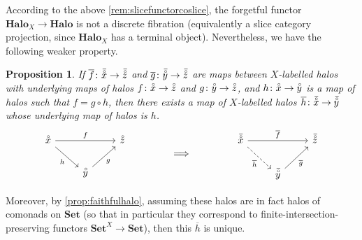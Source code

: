 \documentclass[11pt, oneside, article]{memoir}
\theoremstyle{plain}
\newtheorem{proposition}[theorem]{Proposition}
\theoremstyle{definition}
\theoremstyle{remark}
\newcommand{\dash}{{\mathord{\text{--}}}}
\newcommand{\namedcat}[1]{\mathbf{#1}}
\newcommand{\Halo}{\namedcat{Halo}}
\newcommand{\LHalo}[1]{\Halo_{#1}}
\newcommand{\Set}{\namedcat{Set}}
\newcommand{\halo}[1]{\accentset{\circ}{#1}}
\newcommand{\lhalo}[1]{\accentset{\overline{\circ}}{#1}}
\newcommand{\Ho}[1]{#1}
\newcommand{\xX}{X}
\begin{document}

According to the above \cref{rem:slicefunctorcoslice}, the forgetful
functor $\LHalo{\xX} \to \Halo$ is not a discrete fibration
(equivalently a slice category projection, since $\LHalo{\xX}$ has a
terminal object). Nevertheless, we have the following weaker property.

\begin{proposition}\label{lem:cancellabel}
  If $\overline{f} \colon \lhalo{x} \to \lhalo{z}$ and
  $\overline{g} \colon \lhalo{y} \to \lhalo{z}$ are maps between
  $\xX$-labelled halos with underlying maps of halos
  $f \colon \halo{x} \to \halo{z}$ and
  $g \colon \halo{y} \to \halo{z}$, and
  $h \colon \halo{x} \to \halo{y}$ is a map of halos such that
  $f = g \circ h$, then there exists a map of $\xX$-labelled
  halos $\overline{h} \colon \lhalo{x} \to \lhalo{y}$ whose underlying map of halos
  is $h$.
  \[
    \begin{tikzcd}
      {\halo{x}} && {\halo{z}} \\
      & {\halo{y}}
      \arrow["f", from=1-1, to=1-3]
      \arrow["h"', from=1-1, to=2-2]
      \arrow["g"', from=2-2, to=1-3]
    \end{tikzcd}
    \qquad\qquad\implies\qquad\qquad
    \begin{tikzcd}
      {\lhalo{x}} && {\lhalo{z}} \\
      & {\lhalo{y}}
      \arrow["{\overline{f}}", from=1-1, to=1-3]
      \arrow["{\overline{h}}"', dashed, from=1-1, to=2-2]
      \arrow["{\overline{g}}"', from=2-2, to=1-3]
    \end{tikzcd}
  \]
\end{proposition}

Moreover, by \cref{prop:faithfulhalo}, assuming these halos are in
fact halos of comonads on $\Set$ (so that in particular they
correspond to finite-intersection-preserving functors
$\Set^X \to \Set$), then this $\overline{h}$ is unique.
\end{document}
